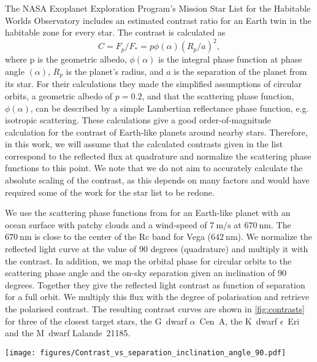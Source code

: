 \documentclass[
    usenatbib,
]{mnras}
\newcommand{\IWA}{\ensuremath{\mathrm{IWA}}}
\newcommand{\hwo}{HabWorlds}
\begin{document}
The NASA Exoplanet Exploration Program’s Mission Star List for the Habitable Worlds Observatory includes an estimated contrast ratio for an Earth twin in the habitable zone for every star. 
%
The contrast is calculated as 
\begin{equation}
C = F_p/F_* = p \phi (\alpha) (R_p/a)^2,
\end{equation}
where p is the geometric albedo, $\phi (\alpha)$ is the integral phase function at phase angle $(\alpha)$, $R_p$ is the planet’s radius, and $a$ is the separation of the planet from its star. 
%
For their calculations they made the simplified assumptions of circular orbits, a geometric albedo of $p=0.2$, and that the scattering phase function, $\phi (\alpha)$, can be described by a simple Lambertian reflectance phase function, e.g. isotropic scattering.
%
These calculations give a good order-of-magnitude calculation for the contrast of Earth-like planets around nearby stars.
%
Therefore, in this work, we will assume that the calculated contrasts given in the list correspond to the reflected flux at quadrature and normalize the scattering phase functions to this point.
%
We note that we do not aim to accurately calculate the absolute scaling of the contrast, as this depends on many factors and would have required some of the work for the star list to be redone.

We use the scattering phase functions from \cite{treesstam2019} for an Earth-like planet with an ocean surface with patchy clouds and a wind-speed of $\SI{7}{\meter\per\second}$ at $\SI{670}{\nano\meter}$.
%
The $\SI{670}{\nano\meter}$ is close to the center of the Rc band for Vega ($\SI{642}{\nano\meter}$). 
%
We normalize the reflected light curve at the value of 90 degrees (quadrature) and multiply it with the contrast.
%
In addition, we map the orbital phase for circular orbits to the scattering phase angle and the on-sky separation given an inclination of $90$ degrees.
%
Together they give the reflected light contrast as function of separation for a full orbit.
%
We multiply this flux with the degree of polarisation and retrieve the polarised contrast.
%
The resulting contrast curves are shown in \cref{fig:contrasts} for three of the closest target stars, the G~dwarf $\alpha$~Cen~A, the K~dwarf $\epsilon$~Eri and the M~dwarf Lalande~21185.

\begin{figure*}%
   \centering
   \texttt{[image: figures/Contrast\_vs\_separation\_inclination\_angle\_90.pdf]}
   \caption{
    The reflected light contrast and orbital separation of an Earth-like planet with an ocean surface and patchy clouds over a planetary orbit assuming an orbital inclination of $90^\circ$ for the stars $\alpha$ Cen A, $\epsilon$ Eri and Lalande 21185. The solid line indicates the contrast in unpolarised light with the contrast at quadrature marked by a solid dot. The polarised component is indicated by the colored dots for which the color represents the scattering phase angle from quadrature. The light grey points show the quadrature contrasts of the other targets in the star list and the dashed lines indicate $1,2$ and $3$ times the \IWA\ for \hwo.
    }
    \label{fig:contrasts}
\end{figure*}
\end{document}
